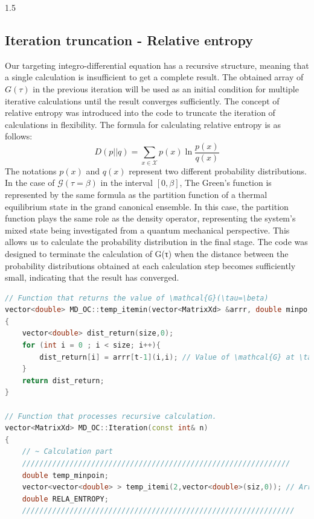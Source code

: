\documentclass{article}
\begin{document}
\begin{spacing}{1.5}
\subsection{Iteration truncation - Relative entropy}
Our targeting integro-differential equation has a recursive structure, meaning that a single calculation is insufficient to get a complete result. The obtained array of $G(\tau)$ in the previous iteration will be used as an initial condition for multiple iterative calculations until the result converges sufficiently. The concept of relative entropy was introduced into the code to truncate the iteration of calculations in flexibility. The formula for calculating relative entropy is as follows:
\begin{equation*}
D(p||q) = \sum_{x\in\mathcal{X}}p(x)\ln\frac{p(x)}{q(x)}
\end{equation*}
The notations $p(x)$ and $q(x)$ represent two different probability distributions.
In the case of $\mathcal{G}(\tau = \beta)$ in the interval $[0,\beta]$, The Green's function is represented by the same formula as the partition function of a thermal equilibrium state in the grand canonical ensemble. In this case, the partition function plays the same role as the density operator, representing the system's mixed state being investigated from a quantum mechanical perspective.
This allows us to calculate the probability distribution in the final stage. The code was designed to terminate the calculation of G(τ) when the distance between the probability distributions obtained at each calculation step becomes sufficiently small, indicating that the result has converged.
\begin{lstlisting}[language=C++, caption=Iteration truncation code]
// Function that returns the value of \mathcal{G}(\tau=\beta)
vector<double> MD_OC::temp_itemin(vector<MatrixXd> &arrr, double minpo, int size)
{
    vector<double> dist_return(size,0);
    for (int i = 0 ; i < size; i++){
        dist_return[i] = arrr[t-1](i,i); // Value of \mathcal{G} at \tau = \beta
    }
    return dist_return;
}

// Function that processes recursive calculation.
vector<MatrixXd> MD_OC::Iteration(const int& n)
{
    // ~ Calculation part
    //////////////////////////////////////////////////////////////
    double temp_minpoin;
    vector<vector<double> > temp_itemi(2,vector<double>(siz,0)); // Arrays to store the results of the previous and current iteration. siz represents the dimension of the calculated square matrix.
    double RELA_ENTROPY;
    ///////////////////////////////////////////////////////////////
    

\end{lstlisting}
\end{spacing}
\end{document}
